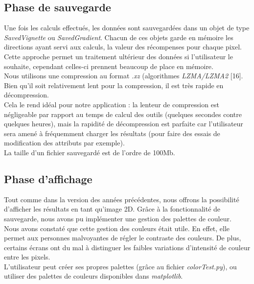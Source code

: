 \documentclass[12pt]{article}
\begin{document}
\subsection{Phase de sauvegarde}

Une fois les calculs effectués, les données sont sauvegardées dans un objet de type \emph{SavedVignette} ou \emph{SavedGradient}. Chacun de ces objets garde en mémoire les directions ayant servi aux calculs, la valeur des récompenses pour chaque pixel. \\

Cette approche permet un traitement ultérieur des données si l'utilisateur le souhaite, cependant celles-ci prennent beaucoup de place en mémoire. \\

Nous utilisons une compression au format \emph{.xz} (algorithmes \emph{LZMA/LZMA2} [16]. Bien qu'il soit relativement lent pour la compression, il est très rapide en décompression. \\

Cela le rend idéal pour notre application : la lenteur de compression est négligeable par rapport au temps de calcul des outils (quelques secondes contre quelques heures), mais la rapidité de décompression est parfaite car l'utilisateur sera amené à fréquemment charger les résultats (pour faire des essais de modification des attributs par exemple). \\

La taille d'un fichier sauvegardé est de l'ordre de 100Mb. \\

\subsection{Phase d'affichage}
\label{sec:affichage}

Tout comme dans la version des années précédentes, nous offrons la possibilité d'afficher les résultats en tant qu'image 2D. Grâce à la fonctionnalité de sauvegarde, nous avons pu implémenter une gestion des palettes de couleur. \\

Nous avons constaté que cette gestion des couleurs était utile. En effet, elle permet aux personnes malvoyantes de régler le contraste des couleurs. De plus, certains écrans ont du mal à distinguer les faibles variations d'intensité de couleur entre les pixels. \\

L'utilisateur peut créer ses propres palettes (grâce au fichier \emph{colorTest.py}), ou utiliser des palettes de couleurs disponibles dans \emph{matplotlib}. \\
\end{document}
